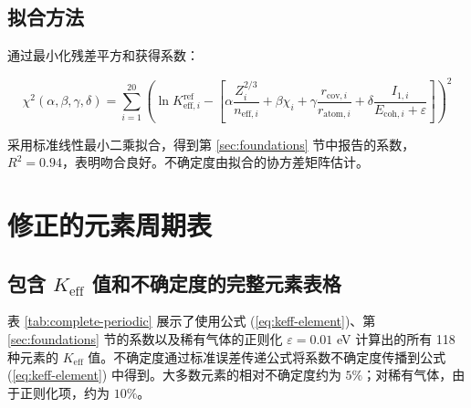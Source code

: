 \documentclass[11pt,a4paper]{article}
\newcommand{\Keff}{K_{\mathrm{eff}}}
\begin{document}
	\subsection{拟合方法}
	
	通过最小化残差平方和获得系数：
	
	\begin{equation}
		\chi^2(\alpha,\beta,\gamma,\delta) = \sum_{i=1}^{20} \left( \ln K_{\mathrm{eff},i}^{\text{ref}} - \left[ \alpha \frac{Z_i^{2/3}}{n_{\text{eff},i}} + \beta \chi_i + \gamma \frac{r_{\text{cov},i}}{r_{\text{atom},i}} + \delta \frac{I_{1,i}}{E_{\text{coh},i} + \varepsilon} \right] \right)^2
		\label{eq:chi2}
	\end{equation}
	
	采用标准线性最小二乘拟合，得到第 \ref{sec:foundations} 节中报告的系数，$R^2 = 0.94$，表明吻合良好。不确定度由拟合的协方差矩阵估计。
	
	\section{修正的元素周期表}
	\label{sec:periodic-table}
	
	\subsection{包含 $\Keff$ 值和不确定度的完整元素表格}
	
	表 \ref{tab:complete-periodic} 展示了使用公式 (\ref{eq:keff-element})、第 \ref{sec:foundations} 节的系数以及稀有气体的正则化 $\varepsilon = 0.01$ eV 计算出的所有 118 种元素的 $\Keff$ 值。不确定度通过标准误差传递公式将系数不确定度传播到公式 (\ref{eq:keff-element}) 中得到。大多数元素的相对不确定度约为 $5\%$；对稀有气体，由于正则化项，约为 $10\%$。
	
\end{document}

